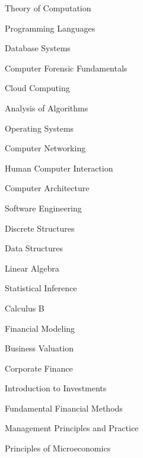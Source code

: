
{{\fontsize{9pt}{1em}\bodyfontlight\upshape\color{text}
\begin{cvcourses}
  \item{Theory of Computation}
  \item{Programming Languages}
  \item{Database Systems}
  \item{Computer Forensic Fundamentals}
  \item{Cloud Computing}
  \item{Analysis of Algorithms}
  \item{Operating Systems}
  \item{Computer Networking}
  \item{Human Computer Interaction}
  \item{Computer Architecture}
  \item{Software Engineering}
  \item{Discrete Structures}
  \item{Data Structures}
\end{cvcourses}
}}

{{\fontsize{9pt}{1em}\bodyfontlight\upshape\color{text}
\begin{cvcourses}
  \item{Linear Algebra}
  \item{Statistical Inference}
  \item{Calculus B}
\end{cvcourses}
}}

{{\fontsize{9pt}{1em}\bodyfontlight\upshape\color{text}
\begin{cvcourses}
  \item{Financial Modeling}
  \item{Business Valuation}
  \item{Corporate Finance}
  \item{Introduction to Investments}
  \item{Fundamental Financial Methods}
  \item{Management Principles and Practice}
  \item{Principles of Microeconomics}
\end{cvcourses}
}}
